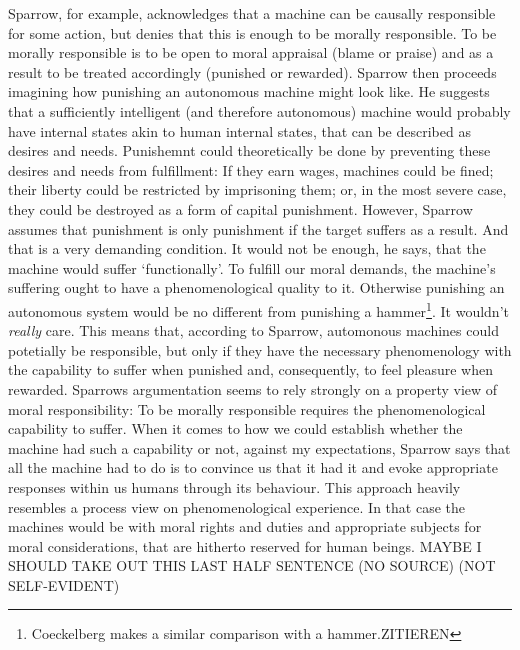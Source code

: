 \documentclass{article}
\newcounter{example}
\begin{document}
Sparrow, for example, acknowledges that a machine can be causally responsible
for some action, but denies that this is enough to be morally responsible. To be
morally responsible is to be open to moral appraisal (blame or praise) and as a
result to be treated accordingly (punished or rewarded). Sparrow then proceeds
imagining how punishing an autonomous machine might look like. He suggests that
a sufficiently intelligent (and therefore autonomous) machine would probably
have internal states akin to human internal states, that can be described as
desires and needs. Punishemnt could theoretically be done by preventing these
desires and needs from fulfillment: If they earn wages, machines could be fined;
their liberty could be restricted by imprisoning them; or, in the most severe
case, they could be destroyed as a form of capital punishment. However, Sparrow
assumes that punishment is only punishment if the target suffers as a result.
And that is a very demanding condition. It would not be enough, he says, that
the machine would suffer `functionally'. To fulfill our moral demands, the
machine's suffering ought to have a phenomenological quality to it. Otherwise
punishing an autonomous system would be no different from punishing a
hammer\footnote{Coeckelberg makes a similar comparison with a hammer.ZITIEREN}.
It wouldn't \textit{really} care.  This means that, according to Sparrow,
automonous machines could potetially be responsible, but only if they have the
necessary phenomenology with the capability to suffer when punished and,
consequently, to feel pleasure when rewarded. Sparrows argumentation seems to
rely strongly on a property view of moral responsibility: To be morally
responsible requires the phenomenological capability to suffer. When it comes to
how we could establish whether the machine had such a capability or not, against
my expectations, Sparrow says that all the machine had to do is to convince us
that it had it and evoke appropriate responses within us humans through its
behaviour. This approach heavily resembles a process view on phenomenological
experience. In that case the machines would be  with
moral rights and duties and appropriate subjects for moral considerations, that
are hitherto reserved for human beings. MAYBE I SHOULD TAKE OUT THIS LAST HALF
SENTENCE (NO SOURCE) (NOT SELF-EVIDENT)


\end{document}
